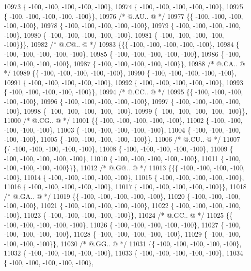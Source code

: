 \begin{DoxyCode}
10973 \{ -100, -100, -100, -100, -100\},
10974 \{ -100, -100, -100, -100, -100\},
10975 \{ -100, -100, -100, -100, -100\}\},
10976 \textcolor{comment}{/*  @.AU.. @ */}
10977 \{\{ -100, -100, -100, -100, -100\},
10978 \{ -100, -100, -100, -100, -100\},
10979 \{ -100, -100, -100, -100, -100\},
10980 \{ -100, -100, -100, -100, -100\},
10981 \{ -100, -100, -100, -100, -100\}\}\},
10982 \textcolor{comment}{/*  @.C@.. @ */}
10983 \{\{\{ -100, -100, -100, -100, -100\},
10984 \{ -100, -100, -100, -100, -100\},
10985 \{ -100, -100, -100, -100, -100\},
10986 \{ -100, -100, -100, -100, -100\},
10987 \{ -100, -100, -100, -100, -100\}\},
10988 \textcolor{comment}{/*  @.CA.. @ */}
10989 \{\{ -100, -100, -100, -100, -100\},
10990 \{ -100, -100, -100, -100, -100\},
10991 \{ -100, -100, -100, -100, -100\},
10992 \{ -100, -100, -100, -100, -100\},
10993 \{ -100, -100, -100, -100, -100\}\},
10994 \textcolor{comment}{/*  @.CC.. @ */}
10995 \{\{ -100, -100, -100, -100, -100\},
10996 \{ -100, -100, -100, -100, -100\},
10997 \{ -100, -100, -100, -100, -100\},
10998 \{ -100, -100, -100, -100, -100\},
10999 \{ -100, -100, -100, -100, -100\}\},
11000 \textcolor{comment}{/*  @.CG.. @ */}
11001 \{\{ -100, -100, -100, -100, -100\},
11002 \{ -100, -100, -100, -100, -100\},
11003 \{ -100, -100, -100, -100, -100\},
11004 \{ -100, -100, -100, -100, -100\},
11005 \{ -100, -100, -100, -100, -100\}\},
11006 \textcolor{comment}{/*  @.CU.. @ */}
11007 \{\{ -100, -100, -100, -100, -100\},
11008 \{ -100, -100, -100, -100, -100\},
11009 \{ -100, -100, -100, -100, -100\},
11010 \{ -100, -100, -100, -100, -100\},
11011 \{ -100, -100, -100, -100, -100\}\}\},
11012 \textcolor{comment}{/*  @.G@.. @ */}
11013 \{\{\{ -100, -100, -100, -100, -100\},
11014 \{ -100, -100, -100, -100, -100\},
11015 \{ -100, -100, -100, -100, -100\},
11016 \{ -100, -100, -100, -100, -100\},
11017 \{ -100, -100, -100, -100, -100\}\},
11018 \textcolor{comment}{/*  @.GA.. @ */}
11019 \{\{ -100, -100, -100, -100, -100\},
11020 \{ -100, -100, -100, -100, -100\},
11021 \{ -100, -100, -100, -100, -100\},
11022 \{ -100, -100, -100, -100, -100\},
11023 \{ -100, -100, -100, -100, -100\}\},
11024 \textcolor{comment}{/*  @.GC.. @ */}
11025 \{\{ -100, -100, -100, -100, -100\},
11026 \{ -100, -100, -100, -100, -100\},
11027 \{ -100, -100, -100, -100, -100\},
11028 \{ -100, -100, -100, -100, -100\},
11029 \{ -100, -100, -100, -100, -100\}\},
11030 \textcolor{comment}{/*  @.GG.. @ */}
11031 \{\{ -100, -100, -100, -100, -100\},
11032 \{ -100, -100, -100, -100, -100\},
11033 \{ -100, -100, -100, -100, -100\},
11034 \{ -100, -100, -100, -100, -100\},

\end{DoxyCode}
